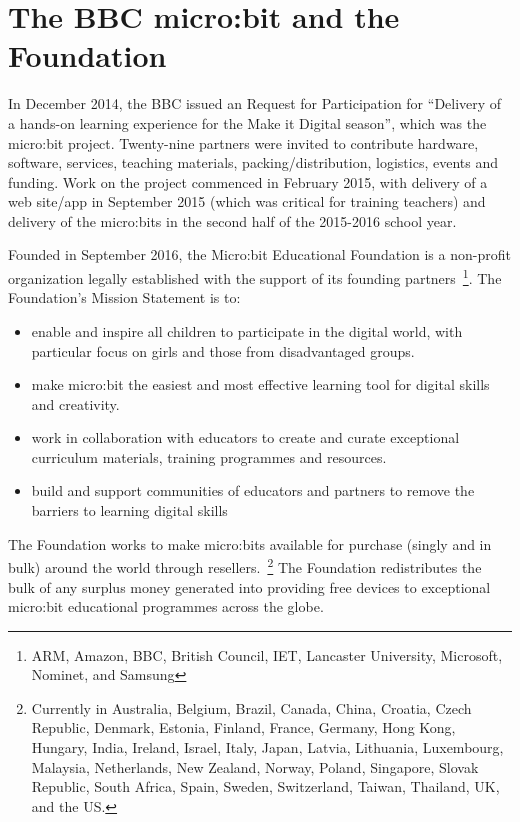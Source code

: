 \section{The BBC micro:bit and the Foundation}
\label{sec:mef}

In December 2014, the BBC issued an Request for Participation
for ``Delivery of a hands-on learning experience for the Make it Digital season'',
which was the micro:bit project.
Twenty-nine partners were invited to contribute hardware, software, services, 
teaching materials, packing/distribution, logistics, events and funding.
Work on the project commenced in February 2015, with delivery of
a web site/app in September 2015 (which was critical
for training teachers) and delivery of the micro:bits in the second
half of the 2015-2016 school year.


Founded in September 2016,
the Micro:bit Educational Foundation is a non-profit organization
legally established with the support of its founding partners~\footnote{ARM,
Amazon, BBC, British Council, IET, Lancaster University, Microsoft,
Nominet, and Samsung}. 
The Foundation's Mission Statement is to: 
\begin{itemize}
\item  enable and inspire all children to participate in the digital world, 
with particular focus on girls and those from disadvantaged groups.
\item make micro:bit the easiest and most effective learning tool for digital skills and creativity.
\item work in collaboration with educators to create and curate exceptional 
curriculum materials, training programmes and resources.
\item build and support communities of educators and partners 
to remove the barriers to learning digital skills
\end{itemize}
The Foundation works to make micro:bits available for purchase (singly and in bulk)
around the world through resellers.~\footnote{Currently in 
Australia, Belgium, Brazil, Canada, China, Croatia, Czech Republic, 
Denmark, Estonia, Finland, France, Germany, Hong Kong, Hungary, India, 
Ireland, Israel, Italy, Japan, Latvia, Lithuania, Luxembourg, Malaysia, 
Netherlands, New Zealand, Norway, Poland, Singapore, Slovak Republic, 
South Africa, Spain, Sweden, Switzerland, Taiwan, Thailand, UK, and the US.}
The Foundation redistributes the bulk of any surplus money 
generated into providing free devices to exceptional 
micro:bit educational programmes across the globe.

